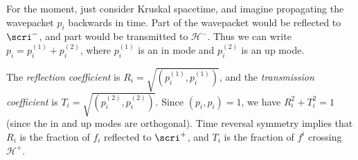 \documentclass{jknotes}
\begin{document}
For the moment, just consider Kruskal spacetime, and imagine propagating the wavepacket \(p_i\) backwards in time. Part of the wavepacket would be reflected to \(\scri^-\), and part would be transmitted to \(\mathcal{H}^-\). Thus we can write \(p_i = p_i^{(1)} + p_i^{(2)}\), where \(p_i^{(1)}\) is an in mode and \(p_i^{(2)}\) is an up mode.

\begin{figure}[H]
    \centering
\end{figure}

The \emph{reflection coefficient} is \(R_i=\sqrt{(p_i^{(1)},p_i^{(1)})}\), and the \emph{transmission coefficient} is \(T_i=\sqrt{(p_i^{(2)},p_i^{(2)})}\). Since \((p_i,p_i)=1\), we have \(R_i^2+T_i^2=1\) (since the in and up modes are orthogonal). Time reversal symmetry implies that \(R_i\) is the fraction of \(f_i\) reflected to \(\scri^+\), and \(T_i\) is the fraction of \(f^i\) crossing \(\mathcal{H}^+\).
\end{document}
